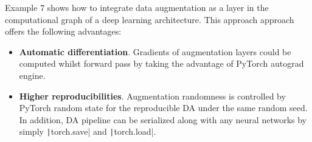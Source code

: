 \newpage
Example 7 shows how to integrate data augmentation as a layer in the computational graph of a deep learning architecture. This approach approach offers the following advantages:

\begin{itemize}[leftmargin=*]
    \item {\bf Automatic differentiation}. Gradients of augmentation layers could be computed whilst forward pass by taking the advantage of PyTorch autograd engine.
    \item {\bf Higher reproducibilities}. Augmentation randomness is controlled by
    PyTorch random state for the reproducible DA under the same random seed.
    In addition, DA pipeline can be serialized along with any neural networks by simply \texttt|torch.save| and \texttt|torch.load|.
    
\end{itemize}

\vspace{5mm}

\begin{tcolorbox}[every float=\centering, drop shadow, title=Example 7: DDA Pipeline]
    \label{fig:examples:pipeline}
    \inputminted[python3, baselinestretch=1., style=vs, fontfamily=courier, fontsize=\footnotesize, funcnamehighlighting=true]{python}{main/chapter03/data/dda/code/exp1_da_pip.py}
    \inputminted[python3, baselinestretch=1., style=vs, fontfamily=courier, fontsize=\footnotesize, funcnamehighlighting=true]{python}{main/chapter03/data/dda/code/exp1_on_device.py}
    \inputminted[python3, baselinestretch=1., style=vs, fontfamily=courier, fontsize=\footnotesize, funcnamehighlighting=true]{python}{main/chapter03/data/dda/code/exp1_sl.py}
\end{tcolorbox}

